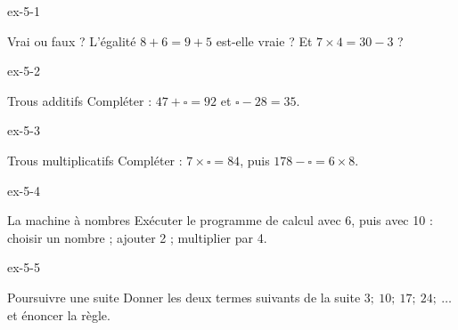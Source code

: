 \clearpage{}
\begin{blocLivre}{ex-5-1}\begin{exercice}[1]{Vrai ou faux ?}
L’égalité $8+6=9+5$ est-elle vraie ? Et $7\times4=30-3$ ?
\end{exercice}\end{blocLivre}
\begin{blocLivre}{ex-5-2}\begin{exercice}[1]{Trous additifs}
Compléter : $47+\square=92$ et $\square-28=35$.
\end{exercice}\end{blocLivre}
\begin{blocLivre}{ex-5-3}\begin{exercice}[1]{Trous multiplicatifs}
Compléter : $7\times\square=84$, puis $178-\square=6\times8$.
\end{exercice}\end{blocLivre}
\begin{blocLivre}{ex-5-4}\begin{exercice}[1]{La machine à nombres}
Exécuter le programme de calcul avec 6, puis avec 10 : choisir un nombre ; ajouter 2 ; multiplier par 4.
\label{fig-ex-5-4}
\end{exercice}\end{blocLivre}
\begin{blocLivre}{ex-5-5}\begin{exercice}[1]{Poursuivre une suite}
Donner les deux termes suivants de la suite $3 ;\ 10 ;\ 17 ;\ 24 ;\ \ldots$ et énoncer la règle.
\end{exercice}\end{blocLivre}

